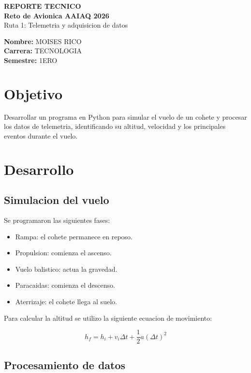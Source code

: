 \documentclass[10pt]{article}
\begin{document}
\begin{center}
{\Large \textbf{REPORTE TECNICO}}\\
\textbf{Reto de Avionica AAIAQ 2026}\\
Ruta 1: Telemetria y adquisicion de datos
\end{center}

\noindent
\textbf{Nombre:} MOISES RICO\\
\textbf{Carrera:} TECNOLOGIA\\
\textbf{Semestre:} 1ERO

\section{Objetivo}

Desarrollar un programa en Python para simular
el vuelo de un cohete y procesar los datos de
telemetria, identificando su altitud, velocidad
y los principales eventos durante el vuelo.

\section{Desarrollo}

\subsection{Simulacion del vuelo}

Se programaron las siguientes fases:

\begin{itemize}
\item Rampa: el cohete permanece en reposo.
\item Propulsion: comienza el ascenso.
\item Vuelo balistico: actua la gravedad.
\item Paracaidas: comienza el descenso.
\item Aterrizaje: el cohete llega al suelo.
\end{itemize}

Para calcular la altitud se utilizo la siguiente
ecuacion de movimiento:

\begin{equation}
h_f=h_i+v_i\Delta t+
\frac{1}{2}a(\Delta t)^2
\end{equation}

\subsection{Procesamiento de datos}
\end{document}
